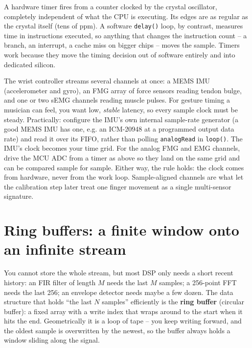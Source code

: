 \begin{whybox}
A hardware timer fires from a counter clocked by the crystal oscillator, completely independent
of what the CPU is executing. Its edges are as regular as the crystal itself (tens of ppm). A
software \texttt{delay()} loop, by contrast, measures time in instructions executed, so anything
that changes the instruction count -- a branch, an interrupt, a cache miss on bigger chips --
moves the sample. Timers work because they move the timing decision out of software entirely and
into dedicated silicon.
\end{whybox}

\begin{goalbox}
The wrist controller streams several channels at once: a MEMS IMU (accelerometer and gyro), an FMG
array of force sensors reading tendon bulge, and one or two sEMG channels reading muscle pulses. For
gesture timing a musician can feel, you want low, \emph{stable} latency, so every sample clock must
be steady. Practically: configure the IMU's own internal sample-rate generator (a good MEMS
IMU has one, e.g. an ICM-20948 at a programmed output data rate) and read it over its FIFO, rather
than polling \texttt{analogRead} in \texttt{loop()}. The IMU's clock becomes your time grid. For the
analog FMG and EMG channels, drive the MCU ADC from a timer as above so they land on the same grid
and can be compared sample for sample. Either way, the rule holds: the clock comes from hardware,
never from the work loop. Sample-aligned channels are what let the calibration step later treat one
finger movement as a single multi-sensor signature.
\end{goalbox}

\section{Ring buffers: a finite window onto an infinite stream}
\label{ch40:ring}

You cannot store the whole stream, but most DSP only needs a short recent history: an FIR filter
of length $M$ needs the last $M$ samples; a 256-point FFT needs the last 256; an envelope detector
needs maybe a few dozen. The data structure that holds ``the last $N$ samples'' efficiently is the
\textbf{ring buffer} (circular buffer): a fixed array with a write index that wraps around to the
start when it hits the end. Geometrically it is a loop of tape -- you keep writing forward, and the
oldest sample is overwritten by the newest, so the buffer always holds a window sliding along the
signal.

